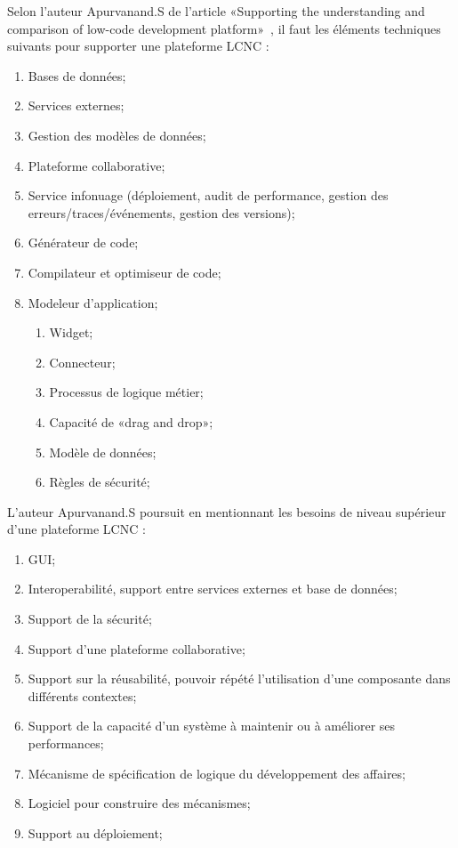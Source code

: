 Selon l'auteur Apurvanand.S de l'article «Supporting the understanding and comparison of low-code development platform»~\cite{9226356}, il faut les éléments techniques suivants pour supporter une plateforme LCNC :
\begin{enumerate}
    \item Bases de données;
    \item Services externes;
    \item Gestion des modèles de données;
    \item Plateforme collaborative;
    \item Service infonuage (déploiement, audit de performance, gestion des erreurs/traces/événements, gestion des versions);
    \item Générateur de code;
    \item Compilateur et optimiseur de code;
    \item Modeleur d’application;
    \begin{enumerate}
        \item Widget;
        \item Connecteur;
        \item Processus de logique métier;
        \item Capacité de «drag and drop»;
        \item Modèle de données;
        \item Règles de sécurité;
    \end{enumerate}
\end{enumerate}

L'auteur Apurvanand.S poursuit en mentionnant les besoins de niveau supérieur d’une plateforme LCNC :
\begin{enumerate}
    \item GUI;
    \item Interoperabilité, support entre services externes et base de données;
    \item Support de la sécurité;
    \item Support d’une plateforme collaborative;
    \item Support sur la réusabilité, pouvoir répété l’utilisation d’une composante dans différents contextes;
    \item Support de la capacité d’un système à maintenir ou à améliorer ses performances;
    \item Mécanisme de spécification de logique du développement des affaires;
    \item Logiciel pour construire des mécanismes;
    \item Support au déploiement;
\end{enumerate}

